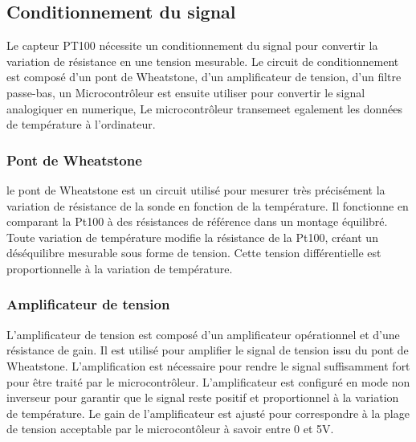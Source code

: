 \subsection{Conditionnement du signal}
Le capteur PT100 nécessite un conditionnement du signal pour convertir la variation de résistance en une tension mesurable.
Le circuit de conditionnement est composé d'un pont de Wheatstone, d'un amplificateur de tension, d'un filtre passe-bas, un Microcontrôleur est ensuite utiliser pour convertir le signal analogiquer en numerique, Le microcontrôleur transemeet egalement les données de température à l'ordinateur.


\subsubsection{Pont de Wheatstone}
le pont de Wheatstone est un circuit utilisé pour mesurer très précisément la variation de résistance de la sonde en fonction de la température. 
Il fonctionne en comparant la Pt100 à des résistances de référence dans un montage équilibré. Toute variation de température modifie la résistance de la Pt100, 
créant un déséquilibre mesurable sous forme de tension. Cette tension différentielle est proportionnelle à la variation de température.

\subsubsection{Amplificateur de tension}
L'amplificateur de tension est composé d'un amplificateur opérationnel et d'une résistance de gain. 
Il est utilisé pour amplifier le signal de tension issu du pont de Wheatstone.
L'amplification est nécessaire pour rendre le signal suffisamment fort pour être traité par le microcontrôleur.
L'amplificateur est configuré en mode non inverseur pour garantir que le signal reste positif et proportionnel à la variation de température.
Le gain de l'amplificateur est ajusté pour correspondre à la plage de tension acceptable par le microcontôleur à savoir entre 0 et 5V.

